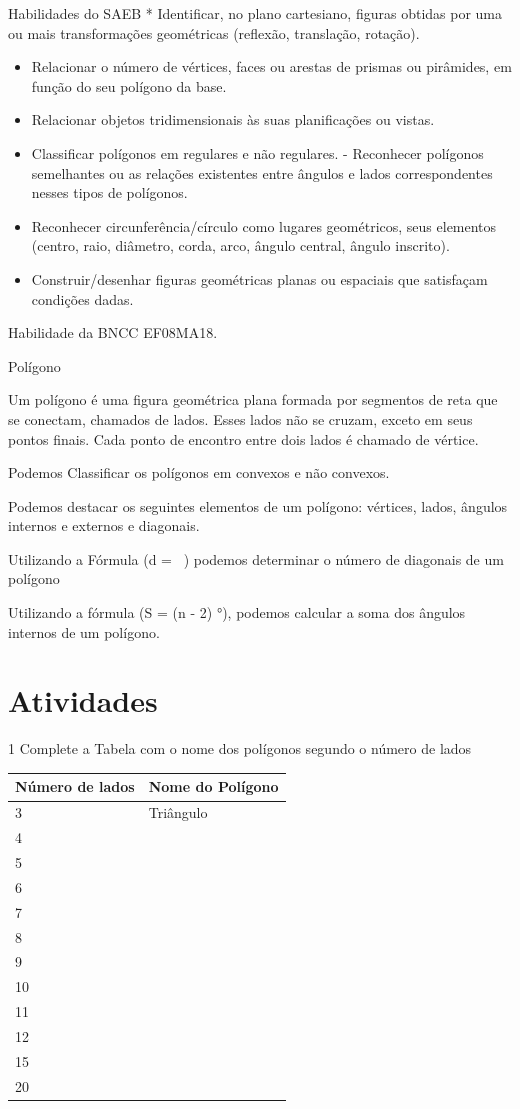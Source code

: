 {Habilidades do SAEB * Identificar, no plano cartesiano, figuras obtidas
por uma ou mais transformações geométricas (reflexão, translação,
rotação).

\begin{itemize}
\item
  Relacionar o número de vértices, faces ou arestas de prismas ou
  pirâmides, em função do seu polígono da base.
\item
  Relacionar objetos tridimensionais às suas planificações ou vistas.
\item
  Classificar polígonos em regulares e não regulares. - Reconhecer
  polígonos semelhantes ou as relações existentes entre ângulos e lados
  correspondentes nesses tipos de polígonos.
\item
  Reconhecer circunferência/círculo como lugares geométricos, seus
  elementos (centro, raio, diâmetro, corda, arco, ângulo central, ângulo
  inscrito).
\item
  Construir/desenhar figuras geométricas planas ou espaciais que
  satisfaçam condições dadas.
\end{itemize}

Habilidade da BNCC EF08MA18.

Polígono

Um polígono é uma figura geométrica plana formada por segmentos de reta
que se conectam, chamados de lados. Esses lados não se cruzam, exceto em
seus pontos finais. Cada ponto de encontro entre dois lados é chamado de
vértice.

Podemos Classificar os polígonos em convexos e não convexos.

Podemos destacar os seguintes elementos de um polígono: vértices, lados,
ângulos internos e externos e diagonais.

Utilizando a Fórmula (d = \ ) podemos determinar o
número de diagonais de um polígono

Utilizando a fórmula (S = (n - 2) °), podemos calcular a
soma dos ângulos internos de um polígono.

\section{Atividades}

\num{1} Complete a Tabela com o nome dos polígonos segundo o número de lados


\begin{longtable}[]{@{}ll@{}}
\toprule
Número de lados & Nome do Polígono\tabularnewline
\midrule
\endhead
3 & Triângulo\tabularnewline
4 & ~\tabularnewline
5 & ~\tabularnewline
6 & ~\tabularnewline
7 & ~\tabularnewline
8 & ~\tabularnewline
9 & ~\tabularnewline
10 & ~\tabularnewline
11 & ~\tabularnewline
12 & ~\tabularnewline
15 & ~\tabularnewline
20 & ~\tabularnewline
\bottomrule
\end{longtable}

}
